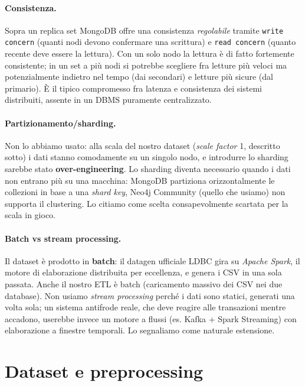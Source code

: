 \documentclass[11pt,a4paper]{article}
\begin{document}
\paragraph{Consistenza.} Sopra un replica set MongoDB offre una consistenza
\emph{regolabile} tramite \texttt{write concern} (quanti nodi devono confermare
una scrittura) e \texttt{read concern} (quanto recente deve essere la lettura).
Con un solo nodo la lettura \`e di fatto fortemente consistente; in un set a pi\`u
nodi si potrebbe scegliere fra letture pi\`u veloci ma potenzialmente
indietro nel tempo (dai secondari) e letture pi\`u sicure (dal primario). \`E il
tipico compromesso fra latenza e consistenza dei sistemi distribuiti, assente
in un DBMS puramente centralizzato.

\paragraph{Partizionamento/sharding.} Non lo abbiamo usato: alla scala del
nostro dataset (\emph{scale factor} 1, descritto sotto) i dati stanno
comodamente su un singolo nodo, e introdurre lo sharding sarebbe stato
\textbf{over-engineering}. Lo sharding diventa necessario quando i dati non
entrano pi\`u su una macchina: MongoDB partiziona orizzontalmente le collezioni
in base a una \emph{shard key}, Neo4j Community (quello che usiamo) non supporta
il clustering. Lo citiamo come scelta consapevolmente scartata per la scala in
gioco.

\paragraph{Batch vs stream processing.} Il dataset \`e prodotto in
\textbf{batch}: il datagen ufficiale LDBC gira su \emph{Apache Spark}, il motore
di elaborazione distribuita per eccellenza, e genera i CSV in una sola passata.
Anche il nostro ETL \`e batch (caricamento massivo dei CSV nei due database). Non
usiamo \emph{stream processing} perch\'e i dati sono statici, generati una volta
sola; un sistema antifrode reale, che deve reagire alle transazioni mentre
accadono, userebbe invece un motore a flussi (es. Kafka + Spark Streaming) con
elaborazione a finestre temporali. Lo segnaliamo come naturale estensione.

\section{Dataset e preprocessing}
\end{document}
